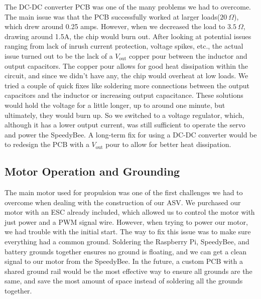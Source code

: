 The DC-DC converter PCB was one of the many problems we had to overcome. The main issue was that the PCB successfully worked at larger loads($20~\Omega$), which drew around 0.25 amps. However, when we decreased the load to $3.5~\Omega$, drawing around 1.5A, the chip would burn out. After looking at potential issues ranging from lack of inrush current protection, voltage spikes, etc., the actual issue turned out to be the lack of a \(V_{\text{out}}\) copper pour between the inductor and output capacitors. The copper pour allows for good heat dissipation within the circuit, and since we didn't have any, the chip would overheat at low loads. We tried a couple of quick fixes like soldering more connections between the output capacitors and the inductor or increasing output capacitance. These solutions would hold the voltage for a little longer, up to around one minute, but ultimately, they would burn up. So we switched to a voltage regulator, which, although it has a lower output current, was still sufficient to operate the servo and power the SpeedyBee. A long-term fix for using a DC-DC converter would be to redesign the PCB with a \(V_{\text{out}}\) pour to allow for better heat dissipation.
\subsection{Motor Operation and Grounding}
The main motor used for propulsion was one of the first challenges we had to overcome when dealing with the construction of our ASV. We purchased our motor with an ESC already included, which allowed us to control the motor with just power and a PWM signal wire. However, when trying to power our motor, we had trouble with the initial start. The way to fix this issue was to make sure everything had a common ground. Soldering the Raspberry Pi, SpeedyBee, and battery grounds together ensures no ground is floating, and we can get a clean signal to our motor from the SpeedyBee. In the future, a custom PCB with a shared ground rail would be the most effective way to ensure all grounds are the same, and save the most amount of space instead of soldering all the grounds together. 

